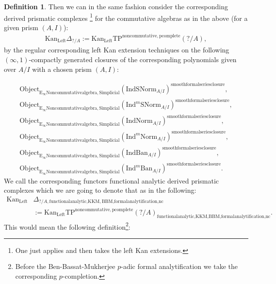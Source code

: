 \documentclass[11pt]{book}
\theoremstyle{definition}
\newtheorem{definition}[theorem]{Definition}
\numberwithin{equation}{section}
\begin{document}
\begin{definition}
Then we can in the same fashion consider the corresponding derived prismatic complexes \cite[Construction 7.6]{12BS}\footnote{One just applies \cite[Construction 7.6]{12BS} and then takes the left Kan extensions.} for the commutative algebras as in the above (for a given prism $(A,I)$):
\begin{align}
\mathrm{Kan}_{\mathrm{Left}}\Delta_{?/A}:=\mathrm{Kan}_{\mathrm{Left}}\mathrm{TP}^\mathrm{noncommutative,pcomplete}(?/A),	
\end{align}
by the regular corresponding left Kan extension techniques on the following $(\infty,1)$-compactly generated closures of the corresponding polynomials given over $A/I$ with a chosen prism $(A,I)$:


\begin{align}
\mathrm{Object}_{\mathrm{E}_\infty\mathrm{Noncommutativealgebra},\mathrm{Simplicial}}(\mathrm{IndSNorm}_{A/I})^{\mathrm{smoothformalseriesclosure}},\\
\mathrm{Object}_{\mathrm{E}_\infty\mathrm{Noncommutativealgebra},\mathrm{Simplicial}}(\mathrm{Ind}^m\mathrm{SNorm}_{A/I})^{\mathrm{smoothformalseriesclosure}},\\
\mathrm{Object}_{\mathrm{E}_\infty\mathrm{Noncommutativealgebra},\mathrm{Simplicial}}(\mathrm{IndNorm}_{A/I})^{\mathrm{smoothformalseriesclosure}},\\
\mathrm{Object}_{\mathrm{E}_\infty\mathrm{Noncommutativealgebra},\mathrm{Simplicial}}(\mathrm{Ind}^m\mathrm{Norm}_{A/I})^{\mathrm{smoothformalseriesclosure}},\\
\mathrm{Object}_{\mathrm{E}_\infty\mathrm{Noncommutativealgebra},\mathrm{Simplicial}}(\mathrm{IndBan}_{A/I})^{\mathrm{smoothformalseriesclosure}},\\
\mathrm{Object}_{\mathrm{E}_\infty\mathrm{Noncommutativealgebra},\mathrm{Simplicial}}(\mathrm{Ind}^m\mathrm{Ban}_{A/I})^{\mathrm{smoothformalseriesclosure}}.
\end{align}
We call the corresponding functors functional analytic derived prismatic complexes which we are going to denote that as in the following:
\begin{align}
\mathrm{Kan}_{\mathrm{Left}}&\Delta_{?/A,\text{functionalanalytic,KKM},\text{BBM,formalanalytification,nc}}\\
&:=\mathrm{Kan}_{\mathrm{Left}}\mathrm{TP}^\mathrm{noncommutative,pcomplete}(?/A)_{\text{functionalanalytic,KKM},\text{BBM,formalanalytification,nc}}.	
\end{align}
This would mean the following definition{\footnote{Before the Ben-Bassat-Mukherjee $p$-adic formal analytification we take the corresponding $p$-completion.}}:

\end{definition}
\end{document}
